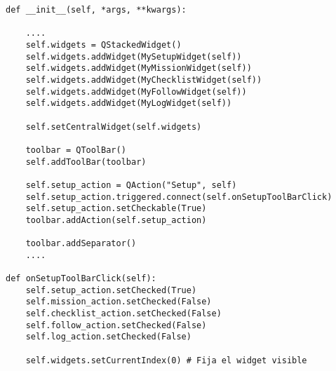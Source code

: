 \begin{verbatim}
def __init__(self, *args, **kwargs):
    
    ....
    self.widgets = QStackedWidget()
    self.widgets.addWidget(MySetupWidget(self))
    self.widgets.addWidget(MyMissionWidget(self))
    self.widgets.addWidget(MyChecklistWidget(self))
    self.widgets.addWidget(MyFollowWidget(self))
    self.widgets.addWidget(MyLogWidget(self))
    
    self.setCentralWidget(self.widgets)

    toolbar = QToolBar()
    self.addToolBar(toolbar)

    self.setup_action = QAction("Setup", self)
    self.setup_action.triggered.connect(self.onSetupToolBarClick)
    self.setup_action.setCheckable(True)
    toolbar.addAction(self.setup_action)

    toolbar.addSeparator()
    ....
    
def onSetupToolBarClick(self):
    self.setup_action.setChecked(True)
    self.mission_action.setChecked(False)
    self.checklist_action.setChecked(False)
    self.follow_action.setChecked(False)
    self.log_action.setChecked(False)

    self.widgets.setCurrentIndex(0) # Fija el widget visible 
    
    
\end{verbatim}
